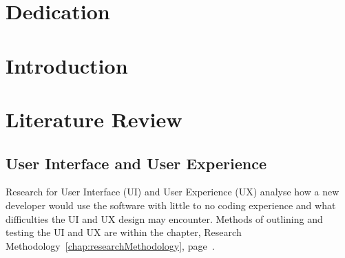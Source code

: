 \documentclass[12pt]{report} %
\begin{document}
\chapter*{Dedication}

\setcounter{page}{5}
	
	\vfill
	
	\newpage %
	\thispagestyle{empty}
	\mbox{}
	


\tableofcontents
\thispagestyle{fancy}

\newpage %
\thispagestyle{empty}
\mbox{}

\listoffigures
\thispagestyle{fancy}

\newpage %
\thispagestyle{empty}
\mbox{}

\listoftables
\thispagestyle{fancy}

\newpage %
\thispagestyle{empty}
\mbox{}


\clearpage
{} %

\chapter{Introduction}

\chapter{Literature Review}
\label{sec:literatureReview}
	\section{User Interface and User Experience}
	\label{subsec:userInterfaceUserExperience}
        Research for User Interface (UI) and User Experience (UX) analyse how a new developer would use the software with little to no coding experience and what difficulties the UI and UX design may encounter. Methods of outlining and testing the UI and UX are within the chapter, Research Methodology~\ref{chap:researchMethodology}, page~\pageref{chap:researchMethodology}.
\end{document}
